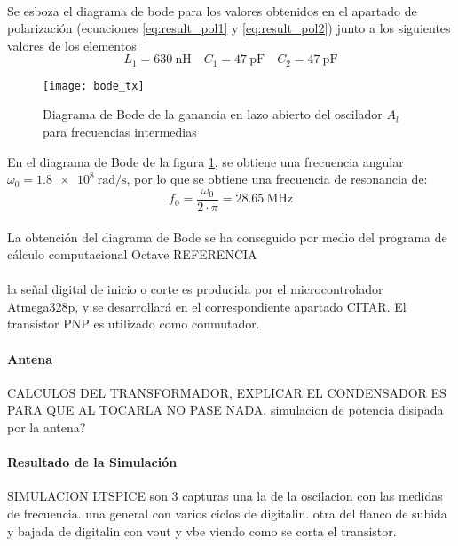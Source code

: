 \paragraph{}
Se esboza el diagrama de bode para los valores obtenidos en el apartado de polarizaci\'on (ecuaciones \ref{eq:result_pol1} y \ref{eq:result_pol2}) junto a los siguientes valores de los elementos 
$$ L_1 = \SI{630}{\nano\henry} \quad C_1=\SI{47}{\pico\farad} \quad C_2=\SI{47}{\pico\farad} $$
\begin{figure}[h]
    \centering
    \texttt{[image: bode\_tx]}
    \caption{Diagrama de Bode de la ganancia en lazo abierto del oscilador $A_l$ para frecuencias intermedias}
    \label{fig:bode_tx}
\end{figure}
En el diagrama de Bode de la figura \ref{fig:bode_tx}, se obtiene una frecuencia angular $\omega_0 = \SI{1.8e8}{\radian\per\second}$, por lo que se obtiene una frecuencia de resonancia de:
\begin{equation}
   f_0 = \frac{\omega_0}{2\cdot\pi} = \SI{28.65}{\mega\hertz}
\end{equation}
\paragraph{}
La obtenci\'on del diagrama de Bode se ha conseguido por medio del programa de c\'alculo computacional Octave REFERENCIA

\paragraph{} la señal digital de inicio o corte es producida por el microcontrolador Atmega328p, y se desarrollará en el correspondiente apartado CITAR. El transistor PNP es utilizado como conmutador.

\paragraph{Antena} CALCULOS DEL TRANSFORMADOR, EXPLICAR EL CONDENSADOR ES PARA QUE AL TOCARLA NO PASE NADA.
simulacion de potencia disipada por la antena?
\paragraph{Resultado de la Simulaci\'on} SIMULACION LTSPICE
son 3 capturas una la de la oscilacion con las medidas de frecuencia.
una general con varios ciclos de digitalin.
otra del flanco de subida y bajada de digitalin con vout y vbe viendo como se corta el transistor.
